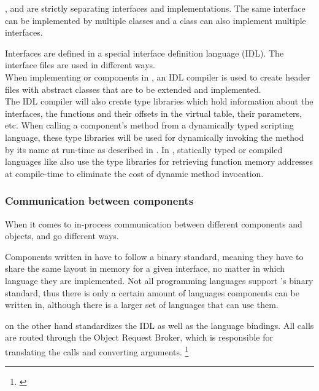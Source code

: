 ,  and  are strictly separating interfaces and implementations. The same interface can be implemented by multiple classes and a class can also implement multiple interfaces.

Interfaces are defined in a special interface definition language (IDL). The interface files are used in different ways.\\
When implementing  or  components in , an IDL compiler is used to create header files with abstract classes that are to be extended and implemented.\\
The IDL compiler will also create type libraries which hold information about the interfaces, the functions and their offsets in the virtual table, their parameters, etc. When calling a component's method from a dynamically typed scripting language, these type libraries will be used for dynamically invoking the method by its name at run-time as described in . In , statically typed or compiled languages like  also use the type libraries for retrieving function memory addresses at compile-time to eliminate the cost of dynamic method invocation.  

\subsubsection{Communication between components}

When it comes to in-process communication between different components and objects,  and  go different ways. 

Components written in  have to follow a binary standard, meaning they have to share the same layout in memory for a given interface, no matter in which language they are implemented. Not all programming languages support 's binary standard, thus there is only a certain amount of languages  components can be written in, although there is a larger set of languages that can use them.

 on the other hand standardizes the IDL as well as the language bindings. All calls are routed through the Object Request Broker, which is responsible for translating the calls and converting arguments. \footnote{\citep[83]{ComponentTechnology}}

